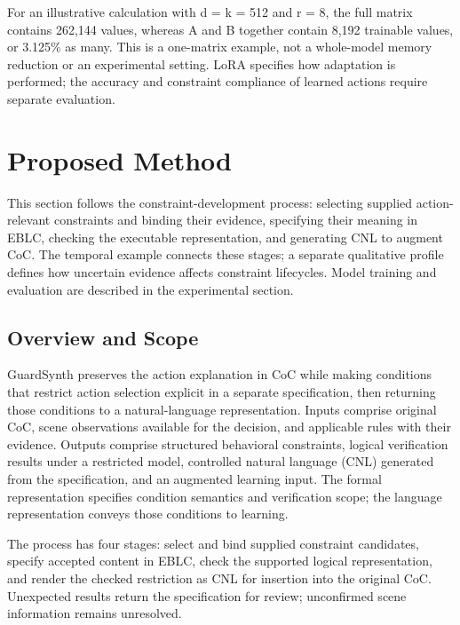 \documentclass[nolineno]{ieeeaccess}
\begin{document}
For an illustrative calculation with d = k = 512 and r = 8, the full matrix contains 262,144 values, whereas A and B together contain 8,192 trainable values, or 3.125\% as many. This is a one-matrix example, not a whole-model memory reduction or an experimental setting. LoRA specifies how adaptation is performed; the accuracy and constraint compliance of learned actions require separate evaluation.\par
\section{Proposed Method}


This section follows the constraint-development process: selecting supplied action-relevant constraints and binding their evidence, specifying their meaning in EBLC, checking the executable representation, and generating CNL to augment CoC. The temporal example connects these stages; a separate qualitative profile defines how uncertain evidence affects constraint lifecycles. Model training and evaluation are described in the experimental section.\par

\subsection{Overview and Scope}

GuardSynth preserves the action explanation in CoC while making conditions that restrict action selection explicit in a separate specification, then returning those conditions to a natural-language representation. Inputs comprise original CoC, scene observations available for the decision, and applicable rules with their evidence. Outputs comprise structured behavioral constraints, logical verification results under a restricted model, controlled natural language (CNL) generated from the specification, and an augmented learning input. The formal representation specifies condition semantics and verification scope; the language representation conveys those conditions to learning.\par

The process has four stages: select and bind supplied constraint candidates, specify accepted content in EBLC, check the supported logical representation, and render the checked restriction as CNL for insertion into the original CoC. Unexpected results return the specification for review; unconfirmed scene information remains unresolved.\par
\end{document}
